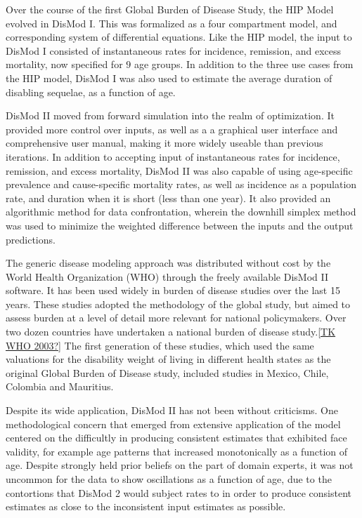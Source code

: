 Over the course of the first Global Burden of Disease Study, the HIP
Model evolved in DisMod I.\cite{Harvard_Global_1996} This was
formalized as a four compartment model, and corresponding system of
differential equations.  Like the HIP model, the input to DisMod I
consisted of instantaneous rates for incidence, remission, and excess
mortality, now specified for $9$ age groups.  In addition to the three
use cases from the HIP model, DisMod I was also used to estimate the
average duration of disabling sequelae, as a function of age.

DisMod II moved from forward simulation into the realm of
optimization.  It provided more control over inputs, as well as a a
graphical user interface and comprehensive user manual, making it more
widely useable than previous iterations.\cite{Barendregt_Generic_2003}
In addition to accepting input of instantaneous rates for incidence,
remission, and excess mortality, DisMod II was also capable of using
age-specific prevalence and cause-specific mortality rates, as well as
incidence as a population rate, and duration when it is short (less
than one year).  It also provided an algorithmic method for data
confrontation, wherein the downhill simplex method was used to
minimize the weighted difference between the inputs and the output
predictions.

The generic disease modeling approach was distributed without cost by
the World Health Organization (WHO) through the freely available
DisMod II software. It has been used widely in burden of disease
studies over the last 15 years. These studies adopted the methodology
of the global study, but aimed to assess burden at a level of detail
more relevant for national policymakers. Over two dozen countries have
undertaken a national burden of disease study.\ref{TK WHO 2003?} The
first generation of these studies, which used the same valuations for
the disability weight of living in different health states as the
original Global Burden of Disease study, included studies in Mexico,
Chile, Colombia and
Mauritius.\cite{Lozano_Burden_1995,Concha_Carga_1996,Republica_Carga_1994,Vos_Mauritius_1996}

Despite its wide application, DisMod II has not been without
criticisms.  One methodological concern that emerged from extensive
application of the model centered on the difficultly in producing
consistent estimates that exhibited face validity, for example age
patterns that increased monotonically as a function of age. Despite
strongly held prior beliefs on the part of domain experts, it was not
uncommon for the data to show oscillations as a function of age, due
to the contortions that DisMod 2 would subject rates to in order to
produce consistent estimates as close to the inconsistent input
estimates as possible.

